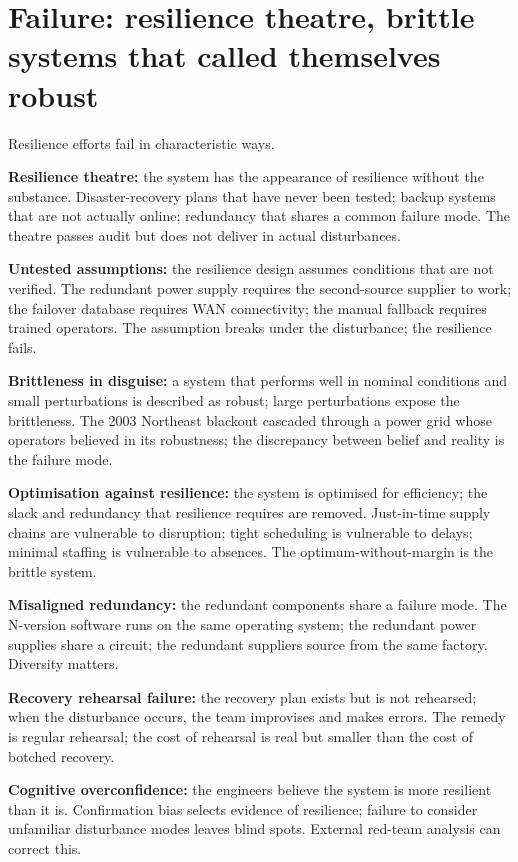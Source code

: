 \section{Failure: resilience theatre, brittle systems that called themselves robust}

Resilience efforts fail in characteristic ways.

\textbf{Resilience theatre:} the system has the appearance of resilience without the substance. Disaster-recovery plans that have never been tested; backup systems that are not actually online; redundancy that shares a common failure mode. The theatre passes audit but does not deliver in actual disturbances.

\textbf{Untested assumptions:} the resilience design assumes conditions that are not verified. The redundant power supply requires the second-source supplier to work; the failover database requires WAN connectivity; the manual fallback requires trained operators. The assumption breaks under the disturbance; the resilience fails.

\textbf{Brittleness in disguise:} a system that performs well in nominal conditions and small perturbations is described as robust; large perturbations expose the brittleness. The 2003 Northeast blackout cascaded through a power grid whose operators believed in its robustness; the discrepancy between belief and reality is the failure mode.

\textbf{Optimisation against resilience:} the system is optimised for efficiency; the slack and redundancy that resilience requires are removed. Just-in-time supply chains are vulnerable to disruption; tight scheduling is vulnerable to delays; minimal staffing is vulnerable to absences. The optimum-without-margin is the brittle system.

\textbf{Misaligned redundancy:} the redundant components share a failure mode. The N-version software runs on the same operating system; the redundant power supplies share a circuit; the redundant suppliers source from the same factory. Diversity matters.

\textbf{Recovery rehearsal failure:} the recovery plan exists but is not rehearsed; when the disturbance occurs, the team improvises and makes errors. The remedy is regular rehearsal; the cost of rehearsal is real but smaller than the cost of botched recovery.

\textbf{Cognitive overconfidence:} the engineers believe the system is more resilient than it is. Confirmation bias selects evidence of resilience; failure to consider unfamiliar disturbance modes leaves blind spots. External red-team analysis can correct this.

